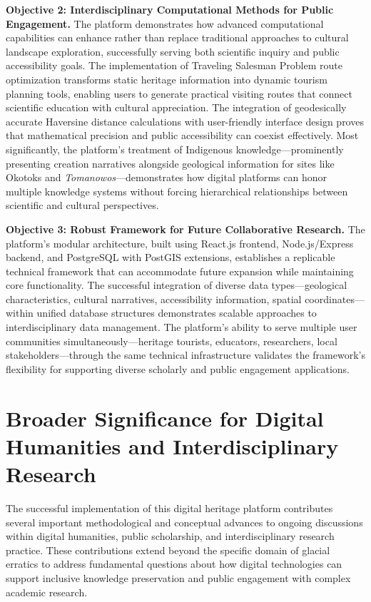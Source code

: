 \textbf{Objective 2: Interdisciplinary Computational Methods for Public Engagement.} The platform demonstrates how advanced computational capabilities can enhance rather than replace traditional approaches to cultural landscape exploration, successfully serving both scientific inquiry and public accessibility goals. The implementation of Traveling Salesman Problem route optimization transforms static heritage information into dynamic tourism planning tools, enabling users to generate practical visiting routes that connect scientific education with cultural appreciation. The integration of geodesically accurate Haversine distance calculations with user-friendly interface design proves that mathematical precision and public accessibility can coexist effectively. Most significantly, the platform's treatment of Indigenous knowledge—prominently presenting creation narratives alongside geological information for sites like Okotoks and \emph{Tomanowos}—demonstrates how digital platforms can honor multiple knowledge systems without forcing hierarchical relationships between scientific and cultural perspectives.

\textbf{Objective 3: Robust Framework for Future Collaborative Research.} The platform's modular architecture, built using React.js frontend, Node.js/Express backend, and PostgreSQL with PostGIS extensions, establishes a replicable technical framework that can accommodate future expansion while maintaining core functionality. The successful integration of diverse data types—geological characteristics, cultural narratives, accessibility information, spatial coordinates—within unified database structures demonstrates scalable approaches to interdisciplinary data management. The platform's ability to serve multiple user communities simultaneously—heritage tourists, educators, researchers, local stakeholders—through the same technical infrastructure validates the framework's flexibility for supporting diverse scholarly and public engagement applications.

\section{Broader Significance for Digital Humanities and Interdisciplinary Research}
\label{sec:broader_significance}

The successful implementation of this digital heritage platform contributes several important methodological and conceptual advances to ongoing discussions within digital humanities, public scholarship, and interdisciplinary research practice. These contributions extend beyond the specific domain of glacial erratics to address fundamental questions about how digital technologies can support inclusive knowledge preservation and public engagement with complex academic research.

